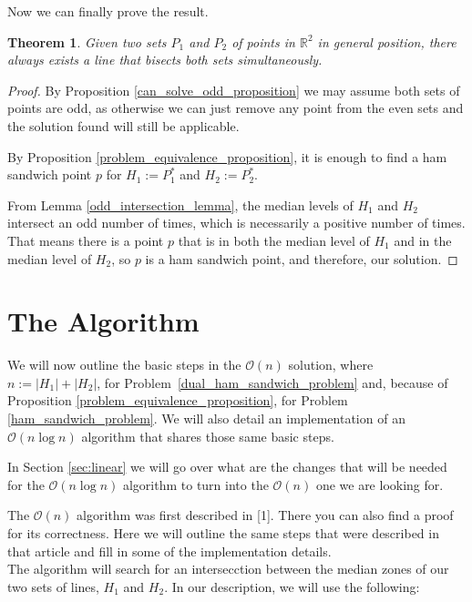 \documentclass{article}
\def\realnumbers{\mathbb{R}}
\def\bigo{\mathcal{O}}
\newtheorem{theorem}{Theorem}
\begin{document}
Now we can finally prove the result.

\begin{theorem}
    Given two sets $P_1$ and $P_2$ of points in $\realnumbers^2 $ in general position, there always exists a line that bisects both sets simultaneously.
\end{theorem}
\begin{proof}
By Proposition \ref{can_solve_odd_proposition} we may assume both sets of points are odd, as otherwise we can just remove any point from the even sets and the solution found will still be applicable.

By Proposition \ref{problem_equivalence_proposition}, it is enough to find a ham sandwich point $p$ for $H_1:=P_1^*$ and $H_2:=P_2^*$.

From Lemma \ref{odd_intersection_lemma}, the median levels of $H_1$ and $H_2$ intersect an odd number of times, which is necessarily a positive number of times. That means there is a point $p$ that is in both the median level of $H_1$ and in the median level of $H_2$, so $p$ is a ham sandwich point, and therefore, our solution.

\end{proof}

\newpage
\section{The Algorithm}\label{sec:nlogn}

We will now outline the basic steps in the $\bigo(n)$ solution, where $n:=|H_1|+|H_2|$, for Problem~\ref{dual_ham_sandwich_problem} and, because of Proposition \ref{problem_equivalence_proposition}, for Problem \ref{ham_sandwich_problem}. We will also detail an implementation of an~$\bigo(n \log n)$ algorithm that shares those same basic steps.

In Section \ref{sec:linear} we will go over what are the changes that will be needed for the $\bigo(n \log n)$ algorithm to turn into the $\bigo(n)$ one we are looking for.

The $\bigo(n)$ algorithm was first described in [1]. There you can also find a proof for its correctness. Here we will outline the same steps that were described in that article and fill in some of the implementation details.\\

The algorithm will search for an intersecction between the median zones of our two sets of lines, $H_1$ and $H_2$. In our description, we will use the following:
\end{document}
